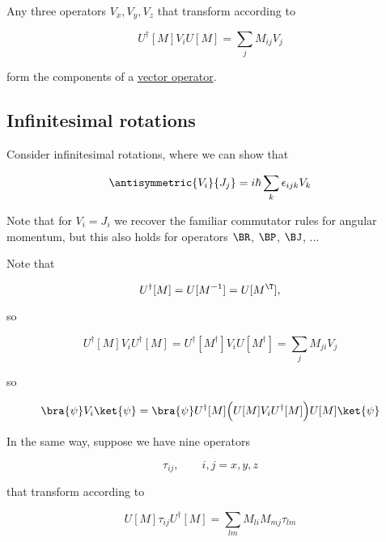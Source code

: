 Any three operators $V_x, V_y, V_z$ that transform according to

\begin{equation}\label{eqn:qmTwoL19:70}
U^\dagger[M] V_i U[M] = \sum_j M_{ij} V_j
\end{equation}

form the components of a \underline{vector operator}.

\subsection{Infinitesimal rotations}

Consider infinitesimal rotations, where we can show that

\begin{equation}\label{eqn:qmTwoL19:90}
\antisymmetric{V_i}{J_j} = i \hbar \sum_k \epsilon_{ijk} V_k
\end{equation}

Note that for $V_i = J_i$ we recover the familiar commutator rules for angular momentum, but this also holds for operators $\BR$, $\BP$, $\BJ$, ...

Note that

\begin{equation}\label{eqn:qmTwoL19:110}
U^\dagger[M] = U[M^{-1}] = U[M^\T],
\end{equation}

so

\begin{equation}\label{eqn:qmTwoL19:130}
U^\dagger[M] V_i U^\dagger[M] = U^\dagger[M^\dagger] V_i U[M^\dagger] = \sum_j M_{ji} V_j
\end{equation}

so

\begin{equation}\label{eqn:qmTwoL19:150}
\bra{\psi} V_i \ket{\psi}
=
\bra{\psi}
U^\dagger[M] \Bigl( U[M] V_i U^\dagger[M] \Bigr) U[M]
\ket{\psi}
\end{equation}

In the same way, suppose we have nine operators

\begin{equation}\label{eqn:qmTwoL19:170}
\tau_{ij}, \qquad i, j = x, y, z
\end{equation}

that transform according to

\begin{equation}\label{eqn:qmTwoL19:190}
U[M] \tau_{ij} U^\dagger[M] = \sum_{lm} M_{li} M_{mj} \tau_{lm}
\end{equation}

